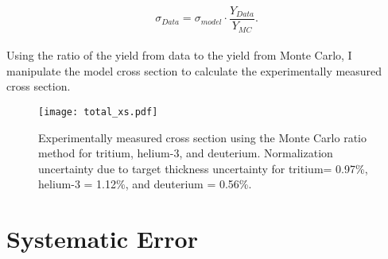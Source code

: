 \begin{equation}
\sigma_{Data} = \sigma_{model} \cdot \frac{Y_{Data}}{Y_{MC}}. \nonumber
\end{equation} 

\paragraph{}Using the ratio of the yield from data to the yield from Monte Carlo, I manipulate the model cross section to calculate the experimentally measured cross section.
 
\begin{figure}
	\texttt{[image: total\_xs.pdf]}
	\caption{Experimentally measured cross section using the Monte Carlo ratio method for tritium, helium-3, and deuterium. Normalization uncertainty due to target thickness uncertainty for tritium= 0.97\%, helium-3 = 1.12\%, and deuterium = 0.56\%. }

\end{figure}

\section{Systematic Error}
\cite{Ar_Ti}




